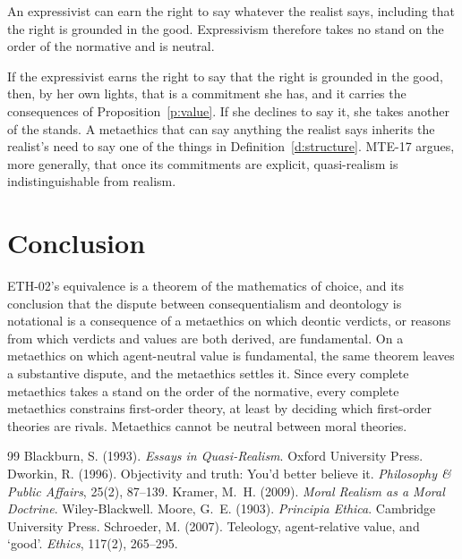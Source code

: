 \documentclass{situationist-preprint}
\begin{document}
\begin{objection}
An expressivist can earn the right to say whatever the realist says, including that the right is grounded in the good. Expressivism therefore takes no stand on the order of the normative and is neutral.
\end{objection}

\begin{reply}
If the expressivist earns the right to say that the right is grounded in the good, then, by her own lights, that is a commitment she has, and it carries the consequences of Proposition~\ref{p:value}. If she declines to say it, she takes another of the stands. A metaethics that can say anything the realist says inherits the realist's need to say one of the things in Definition~\ref{d:structure}. MTE-17 argues, more generally, that once its commitments are explicit, quasi-realism is indistinguishable from realism.
\end{reply}

\section{Conclusion}

ETH-02's equivalence is a theorem of the mathematics of choice, and its conclusion that the dispute between consequentialism and deontology is notational is a consequence of a metaethics on which deontic verdicts, or reasons from which verdicts and values are both derived, are fundamental. On a metaethics on which agent-neutral value is fundamental, the same theorem leaves a substantive dispute, and the metaethics settles it. Since every complete metaethics takes a stand on the order of the normative, every complete metaethics constrains first-order theory, at least by deciding which first-order theories are rivals. Metaethics cannot be neutral between moral theories.

\begin{thebibliography}{99}\small
{} Blackburn, S. (1993). \emph{Essays in Quasi-Realism}. Oxford University Press.
 Dworkin, R. (1996). Objectivity and truth: You'd better believe it. \emph{Philosophy \& Public Affairs}, 25(2), 87--139.
 Kramer, M.~H. (2009). \emph{Moral Realism as a Moral Doctrine}. Wiley-Blackwell.
 Moore, G.~E. (1903). \emph{Principia Ethica}. Cambridge University Press.
 Schroeder, M. (2007). Teleology, agent-relative value, and `good'. \emph{Ethics}, 117(2), 265--295.
\end{thebibliography}
\end{document}
